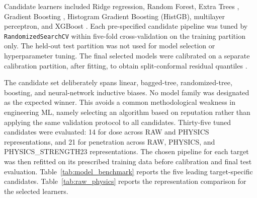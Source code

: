\documentclass[12pt]{elsarticle}
\begin{document}
	Candidate learners included Ridge regression, Random Forest, Extra Trees \cite{Geurts2006ExtraTrees}, Gradient Boosting \cite{Friedman2001GBM}, Histogram Gradient Boosting (HistGB), multilayer perceptron, and XGBoost \cite{ChenGuestrin2016XGBoost}. Each pre-specified candidate pipeline was tuned by \texttt{RandomizedSearchCV} within five-fold cross-validation on the training partition only. The held-out test partition was not used for model selection or hyperparameter tuning. The final selected models were calibrated on a separate calibration partition, after fitting, to obtain split-conformal residual quantiles \cite{Vovk2005Conformal,Lei2018Conformal}.
	
	The candidate set deliberately spans linear, bagged-tree, randomized-tree, boosting, and neural-network inductive biases. No model family was designated as the expected winner. This avoids a common methodological weakness in engineering ML, namely selecting an algorithm based on reputation rather than applying the same validation protocol to all candidates. Thirty-five tuned candidates were evaluated: 14 for dose across RAW and PHYSICS representations, and 21 for penetration across RAW, PHYSICS, and PHYSICS\_STRENGTH23 representations. The chosen pipeline for each target was then refitted on its prescribed training data before calibration and final test evaluation. Table~\ref{tab:model_benchmark} reports the five leading target-specific candidates. Table~\ref{tab:raw_physics} reports the representation comparison for the selected learners.
	
\end{document}
